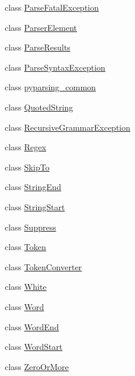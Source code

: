 \begin{DoxyCompactItemize}
\item 
class \hyperlink{classsetuptools_1_1__vendor_1_1pyparsing_1_1_parse_fatal_exception}{Parse\+Fatal\+Exception}
\item 
class \hyperlink{classsetuptools_1_1__vendor_1_1pyparsing_1_1_parser_element}{Parser\+Element}
\item 
class \hyperlink{classsetuptools_1_1__vendor_1_1pyparsing_1_1_parse_results}{Parse\+Results}
\item 
class \hyperlink{classsetuptools_1_1__vendor_1_1pyparsing_1_1_parse_syntax_exception}{Parse\+Syntax\+Exception}
\item 
class \hyperlink{classsetuptools_1_1__vendor_1_1pyparsing_1_1pyparsing__common}{pyparsing\+\_\+common}
\item 
class \hyperlink{classsetuptools_1_1__vendor_1_1pyparsing_1_1_quoted_string}{Quoted\+String}
\item 
class \hyperlink{classsetuptools_1_1__vendor_1_1pyparsing_1_1_recursive_grammar_exception}{Recursive\+Grammar\+Exception}
\item 
class \hyperlink{classsetuptools_1_1__vendor_1_1pyparsing_1_1_regex}{Regex}
\item 
class \hyperlink{classsetuptools_1_1__vendor_1_1pyparsing_1_1_skip_to}{Skip\+To}
\item 
class \hyperlink{classsetuptools_1_1__vendor_1_1pyparsing_1_1_string_end}{String\+End}
\item 
class \hyperlink{classsetuptools_1_1__vendor_1_1pyparsing_1_1_string_start}{String\+Start}
\item 
class \hyperlink{classsetuptools_1_1__vendor_1_1pyparsing_1_1_suppress}{Suppress}
\item 
class \hyperlink{classsetuptools_1_1__vendor_1_1pyparsing_1_1_token}{Token}
\item 
class \hyperlink{classsetuptools_1_1__vendor_1_1pyparsing_1_1_token_converter}{Token\+Converter}
\item 
class \hyperlink{classsetuptools_1_1__vendor_1_1pyparsing_1_1_white}{White}
\item 
class \hyperlink{classsetuptools_1_1__vendor_1_1pyparsing_1_1_word}{Word}
\item 
class \hyperlink{classsetuptools_1_1__vendor_1_1pyparsing_1_1_word_end}{Word\+End}
\item 
class \hyperlink{classsetuptools_1_1__vendor_1_1pyparsing_1_1_word_start}{Word\+Start}
\item 
class \hyperlink{classsetuptools_1_1__vendor_1_1pyparsing_1_1_zero_or_more}{Zero\+Or\+More}
\end{DoxyCompactItemize}
